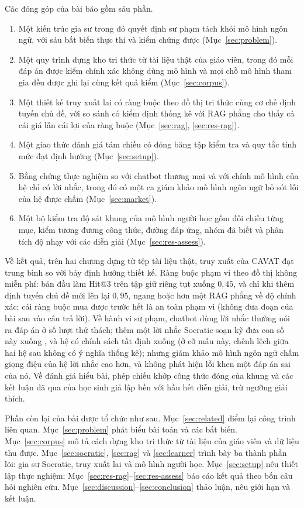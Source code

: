 Các đóng góp của bài báo gồm sáu phần.
\begin{enumerate}[label=(\roman*)]
  \item Một kiến trúc gia sư trong đó quyết định sư phạm tách khỏi mô hình ngôn ngữ, với sáu bất biến thực thi và kiểm chứng được (Mục~\ref{sec:problem}).
  \item Một quy trình dựng kho tri thức từ tài liệu thật của giáo viên, trong đó mỗi đáp án được kiểm chính xác không dùng mô hình và mọi chỗ mô hình tham gia đều được ghi lại cùng kết quả kiểm (Mục~\ref{sec:corpus}).
  \item Một thiết kế truy xuất lai có ràng buộc theo đồ thị tri thức cùng cơ chế định tuyến chủ đề, với so sánh có kiểm định thống kê với RAG phẳng cho thấy cả cái giá lẫn cái lợi của ràng buộc (Mục~\ref{sec:rag}, \ref{sec:res-rag}).
  \item Một giao thức đánh giá tám chiều có đóng băng tập kiểm tra và quy tắc tính mức đạt định hướng (Mục~\ref{sec:setup}).
  \item Bằng chứng thực nghiệm so với chatbot thương mại và với chính mô hình của hệ chỉ có lời nhắc, trong đó có một ca giám khảo mô hình ngôn ngữ bỏ sót lỗi của hệ được chấm (Mục~\ref{sec:market}).
  \item Một bộ kiểm tra độ sát khung của mô hình người học gồm đối chiếu từng mục, kiểm tương đương công thức, đường đáp ứng, nhóm đã biết và phân tích độ nhạy với các diễn giải (Mục~\ref{sec:res-assess}).
\end{enumerate}

Về kết quả, trên hai chương dựng từ \NDocs{} tệp tài liệu thật, truy xuất của CAVAT đạt trung bình \TargetMean{} so với bảy định hướng thiết kế. Ràng buộc phạm vi theo đồ thị không miễn phí: bản đầu làm Hit@3 trên tập giữ riêng tụt xuống $0{,}45$, và chỉ khi thêm định tuyến chủ đề mới lên lại $0{,}95$, ngang hoặc hơn một RAG phẳng về độ chính xác; cái ràng buộc mua được trước hết là an toàn phạm vi (không đưa đoạn của bài sau vào câu trả lời). Về hành vi sư phạm, chatbot dùng lời nhắc thường nói ra đáp án ở \BoneLeakPct{} số lượt thử thách; thêm một lời nhắc Socratic soạn kỹ đưa con số này xuống \BtwoLeakPct{}, và hệ có chính sách tất định xuống \CavLeakPct{} (ở cỡ mẫu này, chênh lệch giữa hai hệ sau không có ý nghĩa thống kê); nhưng giám khảo mô hình ngôn ngữ chấm giọng điệu của hệ lời nhắc cao hơn, và không phát hiện lỗi khen một đáp án sai của nó. Về đánh giá hiểu bài, phép chiếu khớp công thức đóng của khung và các kết luận đã qua của học sinh giả lập bền với hầu hết diễn giải, trừ ngưỡng giải thích.

Phần còn lại của bài được tổ chức như sau. Mục~\ref{sec:related} điểm lại công trình liên quan. Mục~\ref{sec:problem} phát biểu bài toán và các bất biến. Mục~\ref{sec:corpus} mô tả cách dựng kho tri thức từ tài liệu của giáo viên và dữ liệu thu được. Mục~\ref{sec:socratic}, \ref{sec:rag} và \ref{sec:learner} trình bày ba thành phần lõi: gia sư Socratic, truy xuất lai và mô hình người học. Mục~\ref{sec:setup} nêu thiết lập thực nghiệm; Mục~\ref{sec:res-rag}--\ref{sec:res-assess} báo cáo kết quả theo bốn câu hỏi nghiên cứu. Mục~\ref{sec:discussion}--\ref{sec:conclusion} thảo luận, nêu giới hạn và kết luận.
